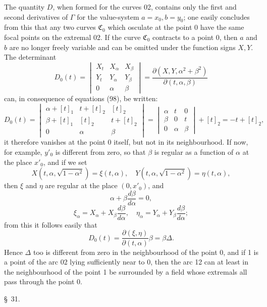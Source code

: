 \documentclass[11pt,a4paper,leqno]{article}
\begin{document}
The quantity $D$, when formed for the curves 02, contains only the first and second derivatives of $\Gamma$ for the value-system $a=x_0,b=y_0$; one easily concludes from this that any two curves $\mathfrak C_0$ which osculate at the point 0 have the same focal points on the extremal 02. If the curve $\mathfrak C_0$ contracts to a point 0, then $a$ and $b$ are no longer freely variable and can be omitted under the function signs $X,Y$. The determinant
\[
D_0(t)=
\begin{vmatrix}
X_t&X_{\alpha}&X_{\beta}\\
Y_t&Y_{\alpha}&Y_{\beta}\\
0&\alpha&\beta
\end{vmatrix}
=\frac{\partial(X,Y,\alpha^2+\beta^2)}{\partial(t,\alpha,\beta)}
\]
can, in consequence of equations (98), be written:
\[
D_0(t)=
\begin{vmatrix}
\alpha+[t]_1&t+[t]_2&[t]_2\\
\beta+[t]_1&[t]_2&t+[t]_2\\
0&\alpha&\beta
\end{vmatrix}
=\begin{vmatrix}
\alpha&t&0\\
\beta&0&t\\
0&\alpha&\beta
\end{vmatrix}+[t]_2=-t+[t]_2,
\]
it therefore vanishes at the point 0 itself, but not in its neighbourhood. If now, for example, $y'_0$ is different from zero, so that $\beta$ is regular as a function of $\alpha$ at the place $x'_0$, and if we set
\[
X(t,\alpha,\sqrt{1-\alpha^2})=\xi(t,\alpha),
\quad
Y(t,\alpha,\sqrt{1-\alpha^2})=\eta(t,\alpha),
\]
then $\xi$ and $\eta$ are regular at the place $(0,x'_0)$, and
\[
\alpha+\beta\frac{d\beta}{d\alpha}=0,
\]
\[
\xi_{\alpha}=X_{\alpha}+X_{\beta}\frac{d\beta}{d\alpha},
\quad
\eta_{\alpha}=Y_{\alpha}+Y_{\beta}\frac{d\beta}{d\alpha};
\]
from this it follows easily that
\[
D_0(t)=\frac{\partial(\xi,\eta)}{\partial(t,\alpha)}\beta=\beta\Delta.
\]
Hence $\Delta$ too is different from zero in the neighbourhood of the point 0, and if 1 is a point of the arc 02 lying sufficiently near to 0, then the arc 12 can at least in the neighbourhood of the point 1 be surrounded by a field whose extremals all pass through the point 0.

\begin{center}{\large \S~31.}\end{center}
\end{document}

